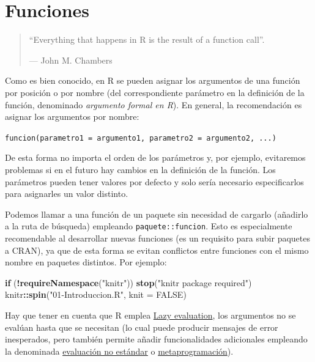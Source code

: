 \documentclass[
]{book}
\newenvironment{Shaded}{\begin{snugshade}}{\end{snugshade}}
\newcommand{\AttributeTok}[1]{\textcolor[rgb]{0.13,0.29,0.53}{#1}}
\newcommand{\ConstantTok}[1]{\textcolor[rgb]{0.56,0.35,0.01}{#1}}
\newcommand{\ControlFlowTok}[1]{\textcolor[rgb]{0.13,0.29,0.53}{\textbf{#1}}}
\newcommand{\FunctionTok}[1]{\textcolor[rgb]{0.13,0.29,0.53}{\textbf{#1}}}
\newcommand{\NormalTok}[1]{#1}
\newcommand{\SpecialCharTok}[1]{\textcolor[rgb]{0.81,0.36,0.00}{\textbf{#1}}}
\newcommand{\StringTok}[1]{\textcolor[rgb]{0.31,0.60,0.02}{#1}}
\theoremstyle{break}
\theoremstyle{nonumberplain}
\begin{document}
\section{Funciones}\label{funciones}

\begin{quote}
``Everything that happens in R is the result of a function call''.

--- John M. Chambers
\end{quote}

Como es bien conocido, en R se pueden asignar los argumentos de una función por posición o por nombre (del correspondiente parámetro en la definición de la función, denominado \emph{argumento formal en R}).
En general, la recomendación es asignar los argumentos por nombre:

\texttt{funcion(parametro1\ =\ argumento1,\ parametro2\ =\ argumento2,\ ...)}

De esta forma no importa el orden de los parámetros y, por ejemplo, evitaremos problemas si en el futuro hay cambios en la definición de la función.
Los parámetros pueden tener valores por defecto y solo sería necesario especificarlos para asignarles un valor distinto.

Podemos llamar a una función de un paquete sin necesidad de cargarlo (añadirlo a la ruta de búsqueda) empleando \texttt{paquete::funcion}.
Esto es especialmente recomendable al desarrollar nuevas funciones (es un requisito para subir paquetes a CRAN), ya que de esta forma se evitan conflictos entre funciones con el mismo nombre en paquetes distintos.
Por ejemplo:

\begin{Shaded}
\begin{Highlighting}[]
\ControlFlowTok{if}\NormalTok{ (}\SpecialCharTok{!}\FunctionTok{requireNamespace}\NormalTok{(}\StringTok{"knitr"}\NormalTok{)) }\FunctionTok{stop}\NormalTok{(}\StringTok{"\textquotesingle{}knitr\textquotesingle{} package required"}\NormalTok{)}
\NormalTok{knitr}\SpecialCharTok{::}\FunctionTok{spin}\NormalTok{(}\StringTok{"01{-}Introduccion.R"}\NormalTok{, }\AttributeTok{knit =} \ConstantTok{FALSE}\NormalTok{)}
\end{Highlighting}
\end{Shaded}

Hay que tener en cuenta que R emplea \href{https://adv-r.hadley.nz/functions.html\#lazy-evaluation}{Lazy evaluation}, los argumentos no se evalúan hasta que se necesitan (lo cual puede producir mensajes de error inesperados, pero también permite añadir funcionalidades adicionales empleando la denominada \href{http://adv-r.had.co.nz/Computing-on-the-language.html}{evaluación no estándar} o \href{https://adv-r.hadley.nz/metaprogramming.html}{metaprogramación}).
\end{document}
